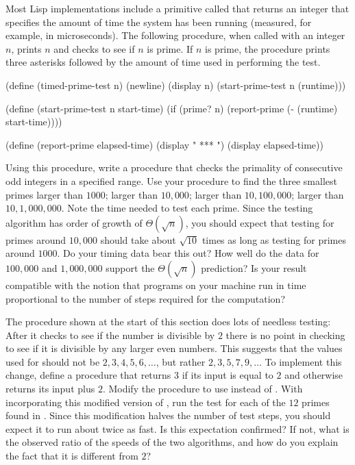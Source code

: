 \begin{exercise}
	\label{Exercise 1.22}
	Most Lisp implementations include a primitive called  that returns an integer that specifies the amount of time the system has been running (measured, for example, in microseconds).
	The following  procedure, when called with an integer \( n \), prints \( n \) and checks to see if \( n \) is prime.
	If \( n \) is prime, the procedure prints three asterisks followed by the amount of time used in performing the test.
	\begin{scheme}
	  (define (timed-prime-test n)
	    (newline)
	    (display n)
	    (start-prime-test n (runtime)))

	  (define (start-prime-test n start-time)
	    (if (prime? n)
	        (report-prime (- (runtime) start-time))))

	  (define (report-prime elapsed-time)
	    (display " *** ")
	    (display elapsed-time))
	\end{scheme}
	Using this procedure, write a procedure  that checks the primality of consecutive odd integers in a specified range.
	Use your procedure to find the three smallest primes larger than \( 1000 \);
	larger than \( 10,000 \);
	larger than \( 10,100,000 \);
	larger than \( 10,1,000,000 \).
	Note the time needed to test each prime.
	Since the testing algorithm has order of growth of \( Θ(\sqrt{n}) \), you should expect that testing for primes around \( 10,000 \) should take about \( \sqrt{10} \) times as long as testing for primes around \( 1000 \).
	Do your timing data bear this out?
	How well do the data for \( 100,000 \) and \( 1,000,000 \) support the \( Θ(\sqrt{n}) \) prediction?
	Is your result compatible with the notion that programs on your machine run in time proportional to the number of steps required for the computation?
\end{exercise}



\begin{exercise}
	\label{Exercise 1.23}
	The  procedure shown at the start of this section does lots of needless testing:
	After it checks to see if the number is divisible by \( 2 \) there is no point in checking to see if it is divisible by any larger even numbers.
	This suggests that the values used for  should not be \( 2, 3, 4, 5, 6, \dotsc \), but rather \( 2, 3, 5, 7, 9, \dotsc \)
	To implement this change, define a procedure  that returns \( 3 \) if its input is equal to \( 2 \) and otherwise returns its input plus \( 2 \).
	Modify the  procedure to use  instead of .
	With  incorporating this modified version of , run the test for each of the \( 12 \) primes found in .
	Since this modification halves the number of test steps, you should expect it to run about twice as fast.
	Is this expectation confirmed?
	If not, what is the observed ratio of the speeds of the two algorithms, and how do you explain the fact that it is different from \( 2 \)?
\end{exercise}



